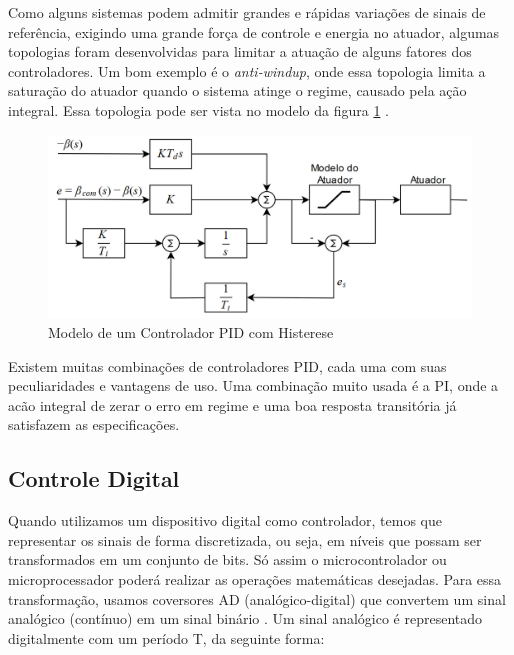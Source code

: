 Como alguns sistemas podem admitir grandes e rápidas variações de sinais de referência, exigindo uma grande força de controle e energia no atuador, algumas topologias foram desenvolvidas para limitar a atuação de alguns fatores dos controladores. Um bom exemplo é o \textit{anti-windup}, onde essa topologia limita a saturação do atuador quando o sistema atinge o regime, causado pela ação integral. Essa topologia pode ser vista no modelo da figura \ref{fig:pid_antiwindup_astrom_p83} \cite{Astrom1995}.

\begin{figure}[H]
  \caption{Modelo de um Controlador PID com Histerese}
  \begin{center}
      \includegraphics[scale=0.55]{referencial/img/pid_antiwindup_astrom_p83}
  \end{center}
  \label{fig:pid_antiwindup_astrom_p83}
\end{figure}

Existem muitas combinações de controladores PID, cada uma com suas peculiaridades e vantagens de uso. Uma combinação muito usada é a PI, onde a acão integral de zerar o erro em regime e uma boa resposta transitória já satisfazem as especificações. 



\subsection{Controle Digital}

Quando utilizamos um dispositivo digital como controlador, temos que representar os sinais de forma discretizada, ou seja, em níveis que possam ser transformados em um conjunto de bits. Só assim o microcontrolador ou microprocessador poderá realizar as operações matemáticas desejadas. Para essa transformação, usamos coversores AD (analógico-digital) que convertem um sinal analógico (contínuo) em um sinal binário \cite{BongWie2001}. Um sinal analógico é representado digitalmente com um período T, da seguinte forma:

